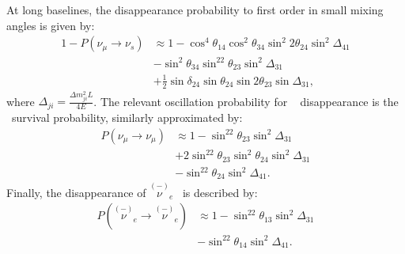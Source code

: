 At long baselines, the  disappearance probability to first order in small mixing angles is given by:
\begin{equation}
\begin{aligned}
1 - P(\nu_{\mu} \rightarrow \nu_s) & \approx 1 - \cos^4\theta_{14}\cos^2\theta_{34}\sin^{2}2\theta_{24}\sin^2\Delta_{41} \\
& - \sin^2\theta_{34}\sin^22\theta_{23}\sin^2\Delta_{31} \\
& + \frac{1}{2}\sin\delta_{24}\sin\theta_{24}\sin2\theta_{23}\sin\Delta_{31},
\end{aligned}
\end{equation}
where $\Delta_{ji} = \frac{\Delta m^2_{ji}L}{4E}$. 
The relevant oscillation probability for \numu~ disappearance is the \numu~survival probability, similarly approximated by:
\begin{equation}
\begin{aligned}
P(\nu_{\mu} \rightarrow \nu_{\mu}) &\approx 1 - \sin^22\theta_{23}\sin^2\Delta_{31} \\
& + 2\sin^22\theta_{23}\sin^2\theta_{24}\sin^2\Delta_{31} \\ 
& - \sin^22\theta_{24}\sin^2\Delta_{41}.
\label{eq:NuMuDisFull}
\end{aligned}
\end{equation}
Finally, the disappearance of $\overset{(-)}\nu\!\!_e$~ is described by: 
\begin{equation}
\begin{aligned}
P(\overset{(-)}\nu\!\!_e \rightarrow \overset{(-)}\nu\!\!_e) &\approx 1 - \sin^22\theta_{13}\sin^2\Delta_{31} \\
& - \sin^22\theta_{14}\sin^2\Delta_{41}.
\label{eq:NueDisFull}
\end{aligned}
\end{equation}

